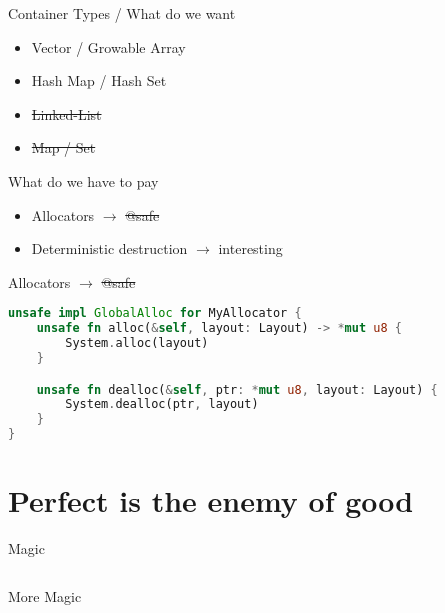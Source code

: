 \documentclass[aspectratio=169,notes]{beamer}
\begin{document}
	\begin{frame}[fragile]{Container Types / What do we want}
		\begin{itemize}
			\item Vector / Growable Array
			\item Hash Map / Hash Set\\[1cm]
			\pause
			\item \st{Linked-List}
			\pause
			\item \st{Map / Set}
		\end{itemize}
	\end{frame}

	\begin{frame}[fragile]{What do we have to pay}
		\begin{itemize}
			\item Allocators $\rightarrow$ \st{@safe}
			\item Deterministic destruction $\rightarrow$ interesting
		\end{itemize}
	\end{frame}

	\begin{frame}[fragile]{Allocators $\rightarrow$ \st{@safe}}
		\begin{lstlisting}[language=Rust]
unsafe impl GlobalAlloc for MyAllocator {
    unsafe fn alloc(&self, layout: Layout) -> *mut u8 {
        System.alloc(layout)
    }

    unsafe fn dealloc(&self, ptr: *mut u8, layout: Layout) {
        System.dealloc(ptr, layout)
    }
}
\end{lstlisting}
	\end{frame}

	\section{Perfect is the enemy of good}
	\begin{frame}[fragile]{Magic}
		\begin{columns}[T]
		\begin{column}{0.52\textwidth}
		
		\end{column}
		\begin{column}{0.48\textwidth}
		\end{column}
		\end{columns}
	\end{frame}

	\begin{frame}[fragile]{More Magic}
		
	\end{frame}
	
\end{document}
